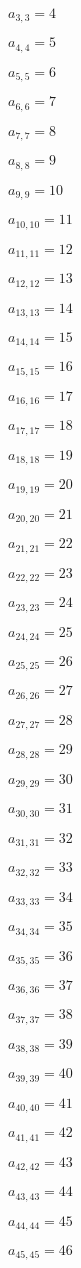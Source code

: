 \documentclass[a4paper,12pt]{article}
\begin{document}
$a _{ 3, 3 } = 4$

$a _{ 4, 4 } = 5$

$a _{ 5, 5 } = 6$

$a _{ 6, 6 } = 7$

$a _{ 7, 7 } = 8$

$a _{ 8, 8 } = 9$

$a _{ 9, 9 } = 10$

$a _{ 10, 10 } = 11$

$a _{ 11, 11 } = 12$

$a _{ 12, 12 } = 13$

$a _{ 13, 13 } = 14$

$a _{ 14, 14 } = 15$

$a _{ 15, 15 } = 16$

$a _{ 16, 16 } = 17$

$a _{ 17, 17 } = 18$

$a _{ 18, 18 } = 19$

$a _{ 19, 19 } = 20$

$a _{ 20, 20 } = 21$

$a _{ 21, 21 } = 22$

$a _{ 22, 22 } = 23$

$a _{ 23, 23 } = 24$

$a _{ 24, 24 } = 25$

$a _{ 25, 25 } = 26$

$a _{ 26, 26 } = 27$

$a _{ 27, 27 } = 28$

$a _{ 28, 28 } = 29$

$a _{ 29, 29 } = 30$

$a _{ 30, 30 } = 31$

$a _{ 31, 31 } = 32$

$a _{ 32, 32 } = 33$

$a _{ 33, 33 } = 34$

$a _{ 34, 34 } = 35$

$a _{ 35, 35 } = 36$

$a _{ 36, 36 } = 37$

$a _{ 37, 37 } = 38$

$a _{ 38, 38 } = 39$

$a _{ 39, 39 } = 40$

$a _{ 40, 40 } = 41$

$a _{ 41, 41 } = 42$

$a _{ 42, 42 } = 43$

$a _{ 43, 43 } = 44$

$a _{ 44, 44 } = 45$

$a _{ 45, 45 } = 46$
\end{document}
